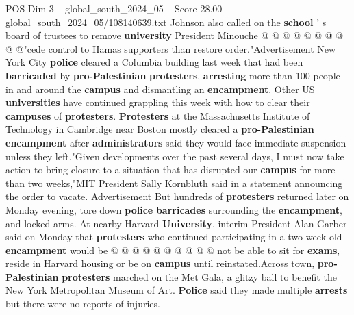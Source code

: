 \begin{textsample}{POS Dim 3 – global\_south\_2024\_05 – Score 28.00 – global\_south\_2024\_05/108140639.txt}
Johnson also called on the \textbf{school} ' s board of trustees to remove \textbf{university} President Minouche @ @ @ @ @ @ @ @ @ @"cede control to Hamas supporters than restore order."Advertisement New York City \textbf{police} cleared a Columbia building last week that had been \textbf{barricaded} by \textbf{pro-Palestinian} \textbf{protesters}, \textbf{arresting} more than 100 people in and around the \textbf{campus} and dismantling an \textbf{encampment}.
Other US \textbf{universities} have continued grappling this week with how to clear their \textbf{campuses} of \textbf{protesters}. \textbf{Protesters} at the Massachusetts Institute of Technology in Cambridge near Boston mostly cleared a \textbf{pro-Palestinian} \textbf{encampment} after \textbf{administrators} said they would face immediate suspension unless they left."Given developments over the past several days, I must now take action to bring closure to a situation that has disrupted our \textbf{campus} for more than two weeks,"MIT President Sally Kornbluth said in a statement announcing the order to vacate.
Advertisement But hundreds of \textbf{protesters} returned later on Monday evening, tore down \textbf{police} \textbf{barricades} surrounding the \textbf{encampment}, and locked arms.
At nearby Harvard \textbf{University}, interim President Alan Garber said on Monday that \textbf{protesters} who continued participating in a two-week-old \textbf{encampment} would be @ @ @ @ @ @ @ @ @ @ not be able to sit for \textbf{exams}, reside in Harvard housing or be on \textbf{campus} until reinstated.Across town, \textbf{pro-Palestinian} \textbf{protesters} marched on the Met Gala, a glitzy ball to benefit the New York Metropolitan Museum of Art. \textbf{Police} said they made multiple \textbf{arrests} but there were no reports of injuries.

\end{textsample}
